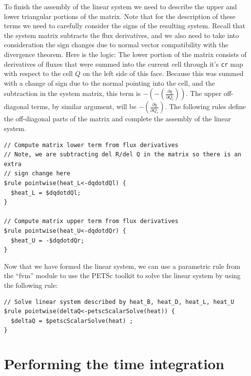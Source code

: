 \documentclass[10pt,epsf,letterpaper,twoside]{book}
\begin{document}
To finish the assembly of the linear system we need to describe the
upper and lower triangular portions of the matrix.  Note that for the
description of these terms we need to carefully consider the signs of
the resulting system.  Recall that the system matrix subtracts the
flux derivatives, and we also need to take into consideration the sign
changes due to normal vector compatibility with the divergence
theorem.  Here is the logic:  The lower portion of the matrix consists
of derivatives of fluxes that were summed into the current cell
through it's {\tt cr} map with respect to the cell $Q$ on the left
side of this face.  Because this was summed with a change of sign due
to the normal pointing into the cell, and the subtraction in the system
matrix, this term is $- (- (\frac{\partial \dot{q}}{\partial Q_l}))$.
The upper off-diagonal terms, by similar argument, will be $-
(\frac{\partial \dot{q}}{\partial Q_r})$.  The following rules define
the off-diagonal parts of the matrix and complete the assembly of the
linear system.
\begin{verbatim}
// Compute matrix lower term from flux derivatives
// Note, we are subtracting del R/del Q in the matrix so there is an extra
// sign change here
$rule pointwise(heat_L<-dqdotdQl) {
  $heat_L = $dqdotdQl; 
}

// Compute matrix upper term from flux derivatives
$rule pointwise(heat_U<-dqdotdQr) {
  $heat_U = -$dqdotdQr;
}
\end{verbatim}

Now that we have formed the linear system, we can use a parametric
rule from the ``fvm'' module to use the PETSc toolkit to solve the
linear system by using the following rule:
\begin{verbatim}
// Solve linear system described by heat_B, heat_D, heat_L, heat_U
$rule pointwise(deltaQ<-petscScalarSolve(heat)) {
  $deltaQ = $petscScalarSolve(heat) ;
}
\end{verbatim}

\section{Performing the time integration}
\end{document}

